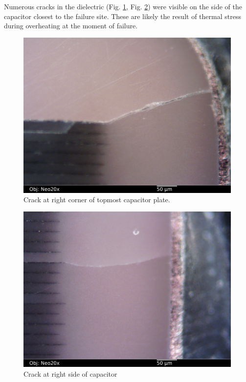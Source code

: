 \documentclass{article}
\begin{document}
Numerous cracks in the dielectric (Fig. \ref{cracks1}, Fig. \ref{cracks2}) were visible on the side of the capacitor
closest to the failure site. These are likely the result of thermal stress during overheating at the moment of failure.

\begin{figure}[h]
\includegraphics[width=12cm,keepaspectratio]{section1_05_df_neo20x_annotated.jpg}
\caption{Crack at right corner of topmost capacitor plate.}
\label{cracks1}
\end{figure}

\begin{figure}[h]
\includegraphics[width=12cm,keepaspectratio]{section1_06_df_neo20x_annotated.jpg}
\caption{Crack at right side of capacitor}
\label{cracks2}
\end{figure}

\FloatBarrier
\end{document}
